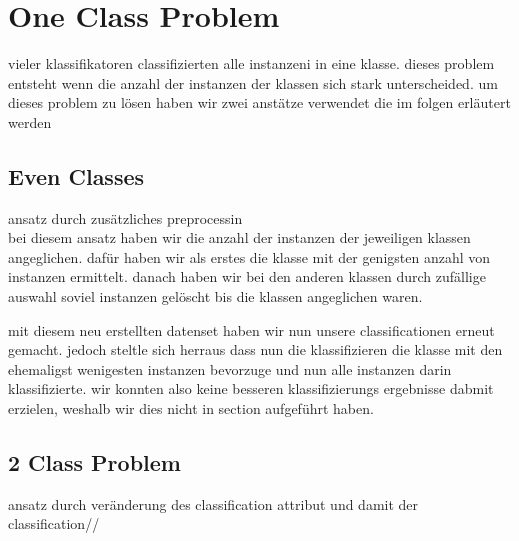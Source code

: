 \section{One Class Problem}
\label{ocp}

vieler klassifikatoren classifizierten alle instanzeni in eine klasse. dieses problem entsteht wenn die anzahl der instanzen der klassen sich stark unterscheided. um dieses problem zu lösen haben wir zwei anstätze verwendet die im folgen erläutert werden


\subsection{Even Classes}
\label{even}
ansatz durch zusätzliches preprocessin\\
bei diesem ansatz haben wir die anzahl der instanzen der jeweiligen klassen angeglichen. dafür haben wir als erstes die klasse mit der genigsten anzahl von instanzen ermittelt. danach haben wir bei den anderen klassen durch zufällige auswahl soviel instanzen gelöscht bis die klassen angeglichen waren.

mit diesem neu erstellten datenset haben wir nun unsere classificationen erneut gemacht. jedoch steltle sich herraus dass nun die klassifizieren die klasse mit den ehemaligst wenigesten instanzen bevorzuge und nun alle instanzen darin klassifizierte. wir konnten also keine besseren klassifizierungs ergebnisse dabmit erzielen, weshalb wir dies nicht in section  aufgeführt haben.



\subsection{2 Class Problem}
\label{2class}
ansatz durch veränderung des classification attribut und damit der classification//

